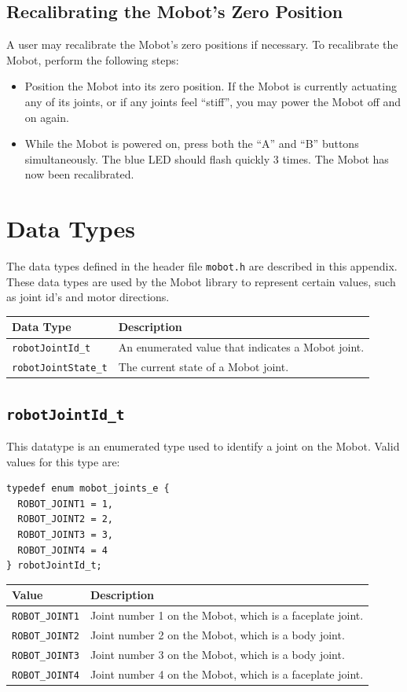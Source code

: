 \documentclass{article}
\begin{document}
\subsection{Recalibrating the Mobot's Zero Position}
A user may recalibrate the Mobot's zero positions if necessary. To recalibrate
the Mobot, perform the following steps:
\begin{itemize}
\item Position the Mobot into its zero position. If the Mobot is currently
actuating any of its joints, or if any joints feel ``stiff'', you may power the
Mobot off and on again.
\item While the Mobot is powered on, press both the ``A'' and ``B'' buttons
simultaneously. The blue LED should flash quickly 3 times. The Mobot has now
been recalibrated.
\end{itemize}

\newpage
\appendix
\section{\label{sec:datatypes}Data Types}
The data types defined in the header file \texttt{mobot.h} are described in
this appendix.
These data types are used by the Mobot library to represent 
certain values, such as joint id's and motor directions.

\begin{tabular}{p{3.5cm}p{10cm}} \hline 
Data Type& Description \\
\hline 
\texttt{robotJointId\_t} & An enumerated value that indicates a Mobot joint. \\
\texttt{robotJointState\_t} & The current state of a Mobot joint. \\
\hline
\end{tabular}

\subsection{\label{sec:robotJointId_t}\texttt{robotJointId\_t}}
This datatype is an enumerated type used to identify a joint on the Mobot. Valid
values for this type are:
\begin{verbatim}
typedef enum mobot_joints_e {
  ROBOT_JOINT1 = 1,
  ROBOT_JOINT2 = 2,
  ROBOT_JOINT3 = 3,
  ROBOT_JOINT4 = 4
} robotJointId_t;
\end{verbatim}

\begin{tabular}{p{3cm}p{10cm}} \hline 
Value & Description \\
\hline 
\texttt{ROBOT\_JOINT1} & Joint number 1 on the Mobot, which is a faceplate joint. \\
\texttt{ROBOT\_JOINT2} & Joint number 2 on the Mobot, which is a body joint. \\
\texttt{ROBOT\_JOINT3} & Joint number 3 on the Mobot, which is a body joint. \\
\texttt{ROBOT\_JOINT4} & Joint number 4 on the Mobot, which is a faceplate joint. \\
\hline
\end{tabular}
\end{document}

